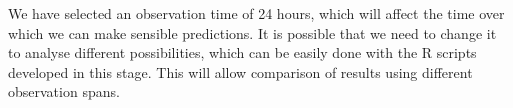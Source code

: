 We have selected an observation time of 24 hours, which will affect the time over which we can make sensible predictions. It is possible that we need to change it to analyse different possibilities, which can be easily done with the R scripts developed in this stage. This will allow comparison of results using different observation spans.

\clearpage


